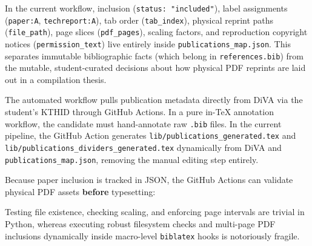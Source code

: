 \documentclass[12pt, twoside]{article}
\newcommand{\fname}[1]{\texttt{#1}}
\begin{document}
\begin{description}[style=nextline, labelwidth = {1cm}, leftmargin = !]
    \item[External Source of Truth (\fname{publications\_map.json})]
In the current workflow, inclusion (\texttt{status: "included"}), label assignments (\texttt{paper:A}, \texttt{techreport:A}), tab order (\texttt{tab\_index}), physical reprint paths (\texttt{file\_path}), page slices (\texttt{pdf\_pages}), scaling factors, and reproduction copyright notices (\texttt{permission\_text}) live entirely inside \fname{publications\_map.json}. This separates immutable bibliographic facts (which belong in \fname{references.bib}) from the mutable, student-curated decisions about how physical \gls{PDF} reprints are laid out in a compilation thesis.


    \item[Two-Way Upstream Sync (\gls{DiVA} Discovery)]
The automated workflow pulls publication metadata directly from \gls{DiVA} via the student's KTHID through GitHub Actions. In a pure in-\TeX{} annotation workflow, the candidate must hand-annotate raw \fname{.bib} files. In the current pipeline, the GitHub Action generates \fname{lib/publications\_generated.tex} and \fname{lib/publications\_dividers\_generated.tex} dynamically from \gls{DiVA} and \fname{publications\_map.json}, removing the manual editing step entirely.

\smallskip\noindent
\item[CI/CD Build-Time Validation]
Because paper inclusion is tracked in \gls{JSON}, the GitHub Actions can validate physical \gls{PDF} assets \textbf{before} typesetting:

\smallskip
\noindent{}
\smallskip

Testing file existence, checking scaling, and enforcing page intervals are trivial in Python, whereas executing robust filesystem checks and multi-page \gls{PDF} inclusions dynamically inside macro-level \texttt{biblatex} hooks is notoriously fragile.



\end{description}
\end{document}
